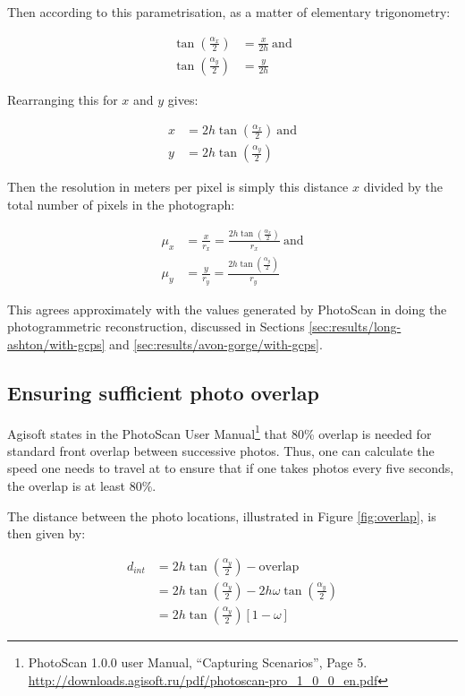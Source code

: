 Then according to this parametrisation, as a matter of elementary trigonometry:

\begin{align}
    \tan\left(\frac{\alpha_x}{2}\right) &= \frac{x}{2h} ~\mathrm{and} \\
    \tan\left(\frac{\alpha_y}{2}\right) &= \frac{y}{2h}
\end{align}

Rearranging this for $x$ and $y$ gives:

\begin{align}
    x &= 2h\tan\left(\frac{\alpha_x}{2}\right) ~\mathrm{and} \\
    y &= 2h\tan\left(\frac{\alpha_y}{2}\right)
\end{align}

Then the resolution in meters per pixel is simply this distance $x$ divided by
the total number of pixels in the photograph:

\begin{align}
    \mu_x &= \frac{x}{r_x} = \frac{2h\tan\left(\frac{\alpha_x}{2}\right)}{r_x}
    ~\mathrm{and} \\
    \mu_y &= \frac{y}{r_y} = \frac{2h\tan\left(\frac{\alpha_y}{2}\right)}{r_y}
\end{align}

This agrees approximately with the values generated by PhotoScan in doing the
photogrammetric reconstruction, discussed in Sections
\ref{sec:results/long-ashton/with-gcps} and
\ref{sec:results/avon-gorge/with-gcps}.

\subsection{Ensuring sufficient photo overlap}

Agisoft states in the PhotoScan User Manual\footnote{PhotoScan 1.0.0 user
Manual, ``Capturing Scenarios'', Page 5.
\url{http://downloads.agisoft.ru/pdf/photoscan-pro\_1\_0\_0\_en.pdf}} that 80\%
overlap is needed for standard front overlap between successive photos. Thus,
one can calculate the speed one needs to travel at to ensure that if one takes
photos every five seconds, the overlap is at least 80\%.

The distance between the photo locations, illustrated in Figure
\ref{fig:overlap}, is then given by:

\begin{align}
    d_{int} &= 2h\tan\left(\frac{\alpha_y}{2}\right) - \mathrm{overlap} \\
            &= 2h\tan\left(\frac{\alpha_y}{2}\right) -
                   2h\omega\tan\left(\frac{\alpha_y}{2}\right) \\
            &= 2h\tan\left(\frac{\alpha_y}{2}\right)\left[ 1 - \omega \right]
\end{align}

